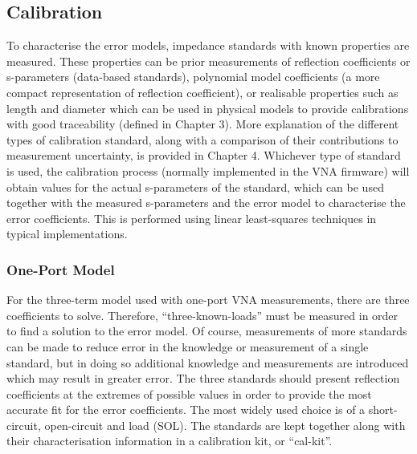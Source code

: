 \documentclass[../thesis/thesis.tex]{subfiles}
\begin{document}
\subsection{Calibration}

To characterise the error models, impedance standards with known properties are measured. These properties can be prior measurements of reflection coefficients or s-parameters (data-based standards), polynomial model coefficients (a more compact representation of reflection coefficient), or realisable properties such as length and diameter which can be used in physical models to provide calibrations with good traceability (defined in Chapter 3). More explanation of the different types of calibration standard, along with a comparison of their contributions to measurement uncertainty, is provided in Chapter 4. Whichever type of standard is used, the calibration process (normally implemented in the VNA firmware) will obtain values for the actual s-parameters of the standard, which can be used together with the measured s-parameters and the error model to characterise the error coefficients. This is performed using linear least-squares techniques in typical implementations.

\subsubsection{One-Port Model}

For the three-term model used with one-port VNA measurements, there are three coefficients to solve. Therefore, ``three-known-loads'' must be measured in order to find a solution to the error model. Of course, measurements of more standards can be made to reduce error in the knowledge or measurement of a single standard, but in doing so additional knowledge and measurements are introduced which may result in greater error. The three standards should present reflection coefficients at the extremes of possible values in order to provide the most accurate fit for the error coefficients. The most widely used choice is of a short-circuit, open-circuit and load (SOL). The standards are kept together along with their characterisation information in a calibration kit, or ``cal-kit''.
\end{document}

